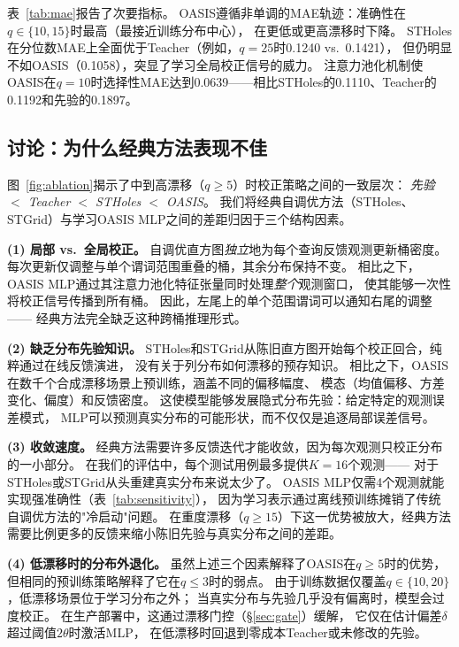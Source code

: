 \documentclass[runningheads]{llncs}
\begin{document}
表~\ref{tab:mae}报告了次要指标。
OASIS遵循非单调的MAE轨迹：准确性在$q{\in}\{10,15\}$时最高（最接近训练分布中心），
在更低或更高漂移时下降。
STHoles在分位数MAE上全面优于Teacher（例如，$q{=}25$时0.1240 vs.\ 0.1421），
但仍明显不如OASIS（0.1058），突显了学习全局校正信号的威力。
注意力池化机制使OASIS在$q{=}10$时选择性MAE达到0.0639——相比STHoles的0.1110、Teacher的0.1192和先验的0.1897。

\subsection{讨论：为什么经典方法表现不佳}
\label{sec:discussion}

图~\ref{fig:ablation}揭示了中到高漂移（$q{\geq}5$）时校正策略之间的一致层次：
\emph{先验 $<$ Teacher $<$ STHoles $<$ OASIS}。
我们将经典自调优方法（STHoles、STGrid）与学习OASIS MLP之间的差距归因于三个结构因素。

\textbf{(1) 局部 vs.\ 全局校正。}
自调优直方图\emph{独立}地为每个查询反馈观测更新桶密度。
每次更新仅调整与单个谓词范围重叠的桶，其余分布保持不变。
相比之下，OASIS MLP通过其注意力池化特征张量同时处理\emph{整个}观测窗口，
使其能够一次性将校正信号传播到所有桶。
因此，左尾上的单个范围谓词可以通知右尾的调整——
经典方法完全缺乏这种跨桶推理形式。

\textbf{(2) 缺乏分布先验知识。}
STHoles和STGrid从陈旧直方图开始每个校正回合，纯粹通过在线反馈演进，
没有关于列分布如何漂移的预存知识。
相比之下，OASIS在数千个合成漂移场景上预训练，涵盖不同的偏移幅度、
模态（均值偏移、方差变化、偏度）和反馈密度。
这使模型能够发展隐式分布先验：给定特定的观测误差模式，
MLP可以预测真实分布的可能形状，而不仅仅是追逐局部误差信号。

\textbf{(3) 收敛速度。}
经典方法需要许多反馈迭代才能收敛，因为每次观测只校正分布的一小部分。
在我们的评估中，每个测试用例最多提供$K{=}16$个观测——
对于STHoles或STGrid从头重建真实分布来说太少了。
OASIS MLP仅需4个观测就能实现强准确性（表~\ref{tab:sensitivity}），
因为学习表示通过离线预训练摊销了传统自调优方法的"冷启动"问题。
在重度漂移（$q{\geq}15$）下这一优势被放大，经典方法需要比例更多的反馈来缩小陈旧先验与真实分布之间的差距。

\textbf{(4) 低漂移时的分布外退化。}
虽然上述三个因素解释了OASIS在$q{\geq}5$时的优势，
但相同的预训练策略解释了它在$q{\leq}3$时的弱点。
由于训练数据仅覆盖$q{\in}\{10,20\}$，低漂移场景位于学习分布之外；
当真实分布与先验几乎没有偏离时，模型会过度校正。
在生产部署中，这通过漂移门控（\S\ref{sec:gate}）缓解，
它仅在估计偏差$\delta$超过阈值$2\theta$时激活MLP，
在低漂移时回退到零成本Teacher或未修改的先验。
\end{document}
